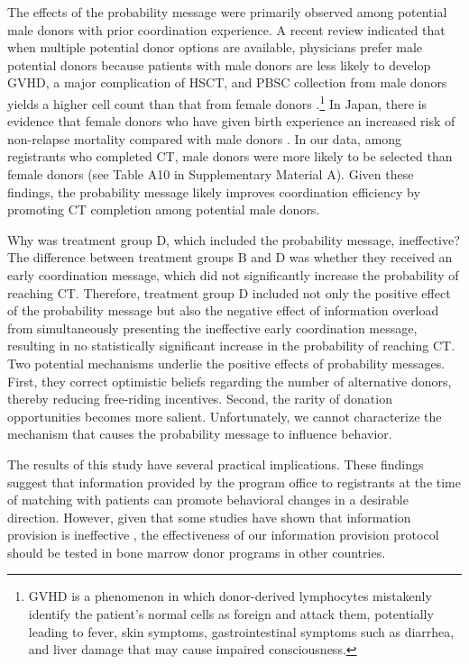 \documentclass[12pt, a4paper]{article}
\begin{document}
The effects of the probability message were primarily observed among potential male donors with prior coordination experience. A recent review indicated that when multiple potential donor options are available, physicians prefer male potential donors because patients with male donors are less likely to develop GVHD, a major complication of HSCT, and PBSC collection from male donors yields a higher cell count than that from female donors \citep{Fingrut2018}.\footnote{GVHD is a phenomenon in which donor-derived lymphocytes mistakenly identify the patient's normal cells as foreign and attack them, potentially leading to fever, skin symptoms, gastrointestinal symptoms such as diarrhea, and liver damage that may cause impaired consciousness.} In Japan, there is evidence that female donors who have given birth experience an increased risk of non-relapse mortality compared with male donors \citep{Shinohara2017}. In our data, among registrants who completed CT, male donors were more likely to be selected than female donors (see Table A10 in Supplementary Material A). Given these findings, the probability message likely improves coordination efficiency by promoting CT completion among potential male donors.

Why was treatment group D, which included the probability message, ineffective? The difference between treatment groups B and D was whether they received an early coordination message, which did not significantly increase the probability of reaching CT. Therefore, treatment group D included not only the positive effect of the probability message but also the negative effect of information overload from simultaneously presenting the ineffective early coordination message, resulting in no statistically significant increase in the probability of reaching CT. Two potential mechanisms underlie the positive effects of probability messages. First, they correct optimistic beliefs regarding the number of alternative donors, thereby reducing free-riding incentives. Second, the rarity of donation opportunities becomes more salient. Unfortunately, we cannot characterize the mechanism that causes the probability message to influence behavior.

The results of this study have several practical implications. These findings suggest that information provided by the program office to registrants at the time of matching with patients can promote behavioral changes in a desirable direction. However, given that some studies have shown that information provision is ineffective \citep[for example,][]{Switzer2018}, the effectiveness of our information provision protocol should be tested in bone marrow donor programs in other countries.

\clearpage


\end{document}
